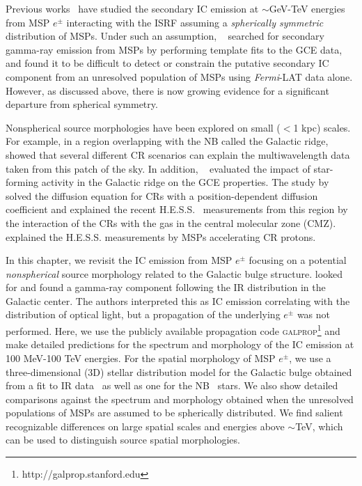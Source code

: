 \documentclass[doublespace,nopageskip]{VTthesis} %
\begin{document}
Previous works~\cite{2015ApJ...802..124Y,2015JCAP...02..023P} have studied the secondary IC emission at $\sim$GeV-TeV energies from MSP $e^\pm$ interacting with the ISRF assuming a \emph{spherically symmetric} distribution of MSPs. Under such an assumption, ~\citet{2016PhRvD..93j3004L} searched for secondary gamma-ray emission from MSPs by performing template fits to the GCE data, and found it to be difficult to detect or constrain the putative secondary IC component from an unresolved population of MSPs using \textit{Fermi}-LAT data alone. However, as discussed above, there is now growing evidence for a significant departure from spherical symmetry.

Nonspherical source morphologies have been explored on small ($<$1 kpc) scales. For example, in a region overlapping with the NB called the Galactic ridge, ~\citet{2015MNRAS.451.1833M} showed that several different CR scenarios can explain the multiwavelength data taken from this patch of the sky. In addition, ~\citet{2016PhRvL.117k1101C} evaluated the impact of star-forming activity in the Galactic ridge on the GCE properties. The study by ~\citet{2017PhRvL.119c1101G} solved the diffusion equation for CRs with a position-dependent diffusion coefficient and explained the recent H.E.S.S.~\cite{2016Natur.531..476H} measurements from this region by the interaction of the CRs with the gas in the central molecular zone (CMZ).~\citet{2018JCAP...07..042G} explained the H.E.S.S. measurements by MSPs accelerating CR protons.

In this chapter, we revisit the IC emission from MSP $e^\pm$ focusing on a potential \emph{nonspherical} source morphology related to the Galactic bulge structure. \citet{2015JCAP...07..013A} looked for and found a gamma-ray component following the IR distribution in the Galactic center. The authors interpreted this as IC emission correlating with the distribution of optical light, but a propagation of the underlying $e^\pm$ was not performed. Here, we use the publicly available propagation code \textsc{galprop}\footnote{http://galprop.stanford.edu}\cite{2000ApJ...537..763S} and make detailed predictions for the spectrum and morphology of the IC emission at 100 MeV-100 TeV energies. For the spatial morphology of MSP $e^\pm$, we use a three-dimensional (3D) stellar distribution model for the Galactic bulge obtained from a fit to IR data~\cite{1998ApJ...492..495F} as well as one for the NB~\cite{2002A&A...384..112L} stars. We also show detailed comparisons against the spectrum and morphology obtained when the unresolved populations of MSPs are assumed to be spherically distributed. We find salient recognizable differences on large spatial scales and energies above $\sim$TeV, which can be used to distinguish source spatial morphologies.
\end{document}
